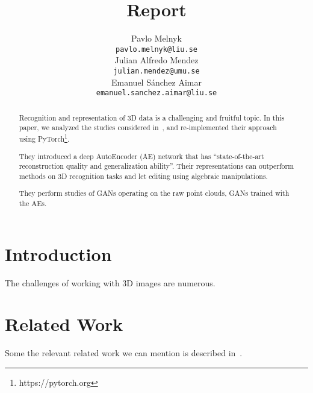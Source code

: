 \documentclass[12pt]{article}
\title{Report}
\author{
    Pavlo Melnyk \\
    \texttt{pavlo.melnyk@liu.se} \\
    \And
    Julian Alfredo Mendez \\
    \texttt{julian.mendez@umu.se} \\
    \And
    Emanuel S\'{a}nchez Aimar \\
    \texttt{emanuel.sanchez.aimar@liu.se} \\
}
\newcommand{\contentdescription}[1]{}
\begin{document}
    \maketitle

    \begin{abstract}
        \contentdescription{
            Abstract (5-10\%) :
            Give an overview of what you have done in the project with the key results and findings of your work.
            Should be no more than 300 words.
        }


        Recognition and representation of 3D data is a challenging and fruitful topic.
        In this paper, we analyzed the studies considered in~\cite{pmlr-v80-achlioptas18a}, and re-implemented their approach using PyTorch\footnote{https://pytorch.org}.

        They introduced a deep AutoEncoder (AE) network that has ``state-of-the-art reconstruction quality and generalization ability''.
        Their representations can outperform methods on 3D recognition tasks and let editing using algebraic manipulations.

        They perform studies of GANs operating on the raw point clouds, GANs trained with the AEs.


    \end{abstract}


    \section{Introduction}

    \contentdescription{
        Introduction (5-15\%):
        Describe the problem, the approach of the paper, the experiments, and the results.
        At the high-level talk about what you worked on in your project and why it is important.
        Then give an overview of your results.
    }

    The challenges of working with 3D images are numerous.


    \section{Related Work}
    \contentdescription{
        Related Work (5-15\%): Discuss the published work related to your project paper, the types of experiments
        you do and the additional method that you have added to this work or you have compared this paper with (if any).
    }

    Some the relevant related work we can mention is described in~\cite{qi2017pointnet}.
\end{document}
